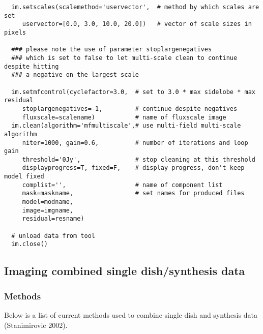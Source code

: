 \begin{verbatim}
  im.setscales(scalemethod='uservector',  # method by which scales are set
     uservector=[0.0, 3.0, 10.0, 20.0])   # vector of scale sizes in pixels

  ### please note the use of parameter stoplargenegatives
  ### which is set to false to let multi-scale clean to continue despite hitting
  ### a negative on the largest scale

  im.setmfcontrol(cyclefactor=3.0,  # set to 3.0 * max sidelobe * max residual
     stoplargenegatives=-1,         # continue despite negatives
     fluxscale=scalename)           # name of fluxscale image
  im.clean(algorithm='mfmultiscale',# use multi-field multi-scale algorithm
     niter=1000, gain=0.6,          # number of iterations and loop gain
     threshold='0Jy',               # stop cleaning at this threshold
     displayprogress=T, fixed=F,    # display progress, don't keep model fixed
     complist='',                   # name of component list
     mask=maskname,                 # set names for produced files
     model=modname,
     image=imgname,
     residual=resname)

  # unload data from tool
  im.close()
\end{verbatim}
\normalsize


\subsection{Imaging combined single dish/synthesis data}
\label{subsection:synth.im.SDcombo}

\subsubsection{Methods}
\label{subsubsection:synth.im.SDcombo.methods}

Below is a list of current methods used to combine single dish and
synthesis data (Stanimirovic 2002).

